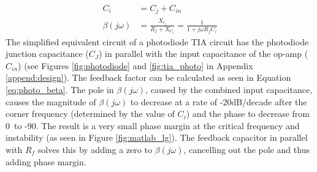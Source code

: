 \begin{align}
    C_i &= C_j+C_{in} \\
    \beta (j\omega) &= \frac{X_{c_i}}{R_f + X_{C_i}} = \frac{1}{1+j\omega R_fC_i} \label{eq:photo_beta}
\end{align}
The simplified equivalent circuit of a photodiode TIA circuit has the photodiode junction capacitance ($C_J$) in parallel with the input capacitance of the op-amp ($C_{in}$) (see Figures \ref{fig:photodiode} and \ref{fig:tia_photo} in Appendix \ref{append:design}). The feedback factor can be calculated as seen in Equation \ref{eq:photo_beta}. The pole in $\beta(j\omega)$, caused by the combined input capacitance, causes the magnitude of $\beta(j\omega)$ to decrease at a rate of -20dB/decade after the corner frequency (determined by the value of $C_{i}$) and the phase to decrease from 0\textdegree\ to -90\textdegree. The result is a very small phase margin at the critical frequency and instability (as seen in Figure \ref{fig:matlab_lg}). The feedback capacitor in parallel with $R_f$ solves this by adding a zero to $\beta(j\omega)$, cancelling out the pole and thus adding phase margin.

